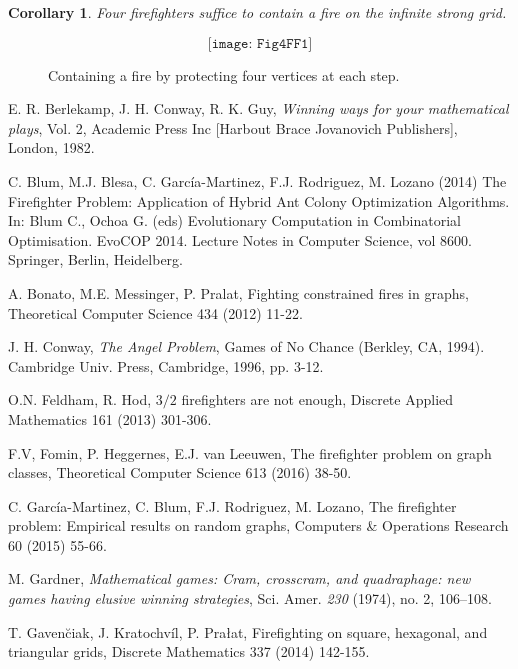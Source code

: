 \documentclass[12pt]{article}
\newtheorem{corollary}[theorem]{Corollary}
\begin{document}
\begin{corollary} Four firefighters suffice to contain a fire on the infinite strong grid.\end{corollary}


\begin{figure}[htbp]
\[ \texttt{[image: Fig4FF1]}\]
\caption{Containing a fire by protecting four vertices at each step.} 

\label{fig:4ff} 
\end{figure}


\begin{thebibliography}{99}

 E. R. Berlekamp, J. H. Conway, R. K. Guy, \emph{Winning ways for your mathematical plays}, Vol. 2, Academic Press Inc [Harbout Brace Jovanovich Publishers], London, 1982.

 C. Blum, M.J. Blesa, C. Garc\'{i}a-Martinez, F.J. Rodriguez, M. Lozano (2014) The Firefighter Problem: Application of Hybrid Ant Colony Optimization Algorithms. In: Blum C., Ochoa G. (eds) Evolutionary Computation in Combinatorial Optimisation. EvoCOP 2014. Lecture Notes in Computer Science, vol 8600. Springer, Berlin, Heidelberg. %

 A. Bonato, M.E. Messinger, P. Pralat, Fighting constrained fires in graphs, Theoretical Computer Science 434 (2012) 11-22.

 J. H. Conway, \emph{The Angel Problem}, Games of No Chance (Berkley, CA, 1994). Cambridge Univ. Press, Cambridge, 1996, pp. 3-12.

 O.N. Feldham, R. Hod, $3/2$ firefighters are not enough, Discrete Applied Mathematics 161 (2013) 301-306.

 F.V, Fomin, P. Heggernes, E.J. van Leeuwen, The firefighter problem on graph classes, Theoretical Computer Science  613  (2016) 38-50.

 C. Garc\'{i}a-Martinez, C. Blum, F.J. Rodriguez, M. Lozano, The firefighter problem: Empirical results on random graphs, Computers \& Operations Research 60 (2015) 55-66.

 M. Gardner, \emph{Mathematical games: Cram, crosscram, and quadraphage: new games having elusive winning strategies}, Sci. Amer. {\it 230}  (1974), no. 2, 106--108.

 T. Gaven\u{c}iak, J. Kratochv\'{i}l, P. Pra\l at, Firefighting on square, hexagonal, and triangular grids, Discrete Mathematics 337 (2014) 142-155.


\end{thebibliography}
\end{document}
